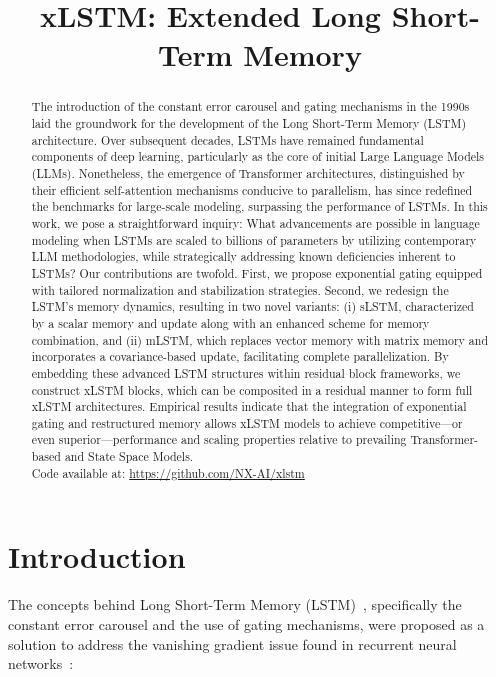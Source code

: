 \title{xLSTM: Extended Long Short-Term Memory}

\begin{abstract}
The introduction of the constant error carousel and gating mechanisms in the 1990s laid the groundwork for the development of the Long Short-Term Memory (LSTM) architecture. Over subsequent decades, LSTMs have remained fundamental components of deep learning, particularly as the core of initial Large Language Models (LLMs). Nonetheless, the emergence of Transformer architectures, distinguished by their efficient self-attention mechanisms conducive to parallelism, has since redefined the benchmarks for large-scale modeling, surpassing the performance of LSTMs. In this work, we pose a straightforward inquiry: What advancements are possible in language modeling when LSTMs are scaled to billions of parameters by utilizing contemporary LLM methodologies, while strategically addressing known deficiencies inherent to LSTMs? Our contributions are twofold. First, we propose exponential gating equipped with tailored normalization and stabilization strategies. Second, we redesign the LSTM’s memory dynamics, resulting in two novel variants: (i) sLSTM, characterized by a scalar memory and update along with an enhanced scheme for memory combination, and (ii) mLSTM, which replaces vector memory with matrix memory and incorporates a covariance-based update, facilitating complete parallelization. By embedding these advanced LSTM structures within residual block frameworks, we construct xLSTM blocks, which can be composited in a residual manner to form full xLSTM architectures. Empirical results indicate that the integration of exponential gating and restructured memory allows xLSTM models to achieve competitive—or even superior—performance and scaling properties relative to prevailing Transformer-based and State Space Models.\\
Code available at: \url{https://github.com/NX-AI/xlstm}
\end{abstract}

\section{Introduction}
\label{sec:intro}

The concepts behind Long Short-Term Memory (LSTM)~\citep{Hochreiter:91,Hochreiter:97nips,Hochreiter:97}, specifically the constant error carousel and the use of gating mechanisms, were proposed as a solution to address the vanishing gradient issue found in recurrent neural networks~\citep{Hochreiter:91,Hochreiter:00book}:

